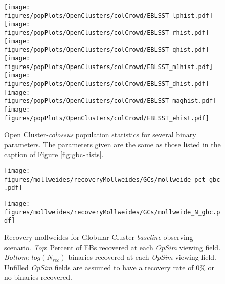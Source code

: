 \documentclass[twocolumn]{aastex63}
\begin{document}
\begin{figure*}[p]
    \centering
    \texttt{[image: figures/popPlots/OpenClusters/colCrowd/EBLSST\_lphist.pdf]}
    \texttt{[image: figures/popPlots/OpenClusters/colCrowd/EBLSST\_rhist.pdf]} 
    \texttt{[image: figures/popPlots/OpenClusters/colCrowd/EBLSST\_qhist.pdf]} 
    \texttt{[image: figures/popPlots/OpenClusters/colCrowd/EBLSST\_m1hist.pdf]} 
    \texttt{[image: figures/popPlots/OpenClusters/colCrowd/EBLSST\_dhist.pdf]}
    \texttt{[image: figures/popPlots/OpenClusters/colCrowd/EBLSST\_maghist.pdf]} 
    \texttt{[image: figures/popPlots/OpenClusters/colCrowd/EBLSST\_ehist.pdf]} 
    
    \caption{Open Cluster-\textit{colossus}  population statistics for several binary parameters. The parameters given are the same as those listed in the caption of Figure \ref{fig:gbc-hists}.} 
    \label{fig:occ-hists}
\end{figure*}

\begin{figure}

    \centering
    \texttt{[image: figures/mollweides/recoveryMollweides/GCs/mollweide\_pct\_gbc.pdf]}

    \texttt{[image: figures/mollweides/recoveryMollweides/GCs/mollweide\_N\_gbc.pdf]}

    \caption{Recovery mollweides for Globular Cluster-\textit{baseline} observing scenario. \textit{Top}: Percent of EBs recovered at each \textit{OpSim} viewing field. \textit{Bottom}: $log(N_{rec})$ binaries recovered at each \textit{OpSim} viewing field. Unfilled \textit{OpSim} fields are assumed to have a recovery rate of 0\% or no binaries recovered.}
    \label{fig:gbc_recovery_mollweides}
    
\end{figure}
\end{document}
